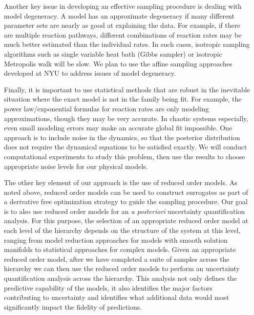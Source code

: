 \documentclass[11pt]{article}
\begin{document}
Another key issue in developing an effective sampling procedure is dealing with model degeneracy.
A model has an approximate degeneracy if many different parameter sets are nearly as good at explaining
the data.
For example, if there are multiple reaction pathways,
different combinations of reaction rates may be much
better estimated than the individual rates.
In such cases, isotropic sampling algorithms such as single variable heat bath (Gibbs sampler) or
isotropic Metropolis walk will be slow.
We plan to use the affine sampling approaches developed at NYU to address issues of model degeneracy.

Finally, it is important to use statistical methods that are robust in the inevitable situation where the
exact model is not in the family being fit.
For example, the power law/exponential formulas for reaction rates are only modeling approximations, though they
may be very accurate.
In chaotic systems especially, even small modeling errors may make an accurate global fit impossible.
One approach is to include noise in the dynamics, so that the posterior distribution does not require
the dynamical equations to be satisfied exactly.
We will conduct computational experiments to study this problem, then use the results to 
choose appropriate noise levels for our physical models.

The other key element of our approach is the use of reduced order models.  As noted above, reduced
order models can be used to construct surrogates
as part of a derivative free optimization strategy to guide the sampling procedure.
Our goal is to also use reduced order models for an {\it {a posteriori}} uncertainty quantification analysis.
For this purpose,
the selection of an appropriate reduced order model at each level of the hierarchy depends on the
structure of the system at this level,
ranging from model reduction approaches for models with smooth solution manifolds to statistical
approaches for complex models.
Given an appropriate reduced order model, after we have completed a suite of samples across the hierarchy
we can then use the reduced order models to perform an uncertainty quantification analysis across
the hierarchy.  This analysis not only defines the predictive capability of the models, it also identifies
the major factors contributing to uncertainty and identifies what additional data would most significantly
impact the fidelity of predictions.
\end{document}
